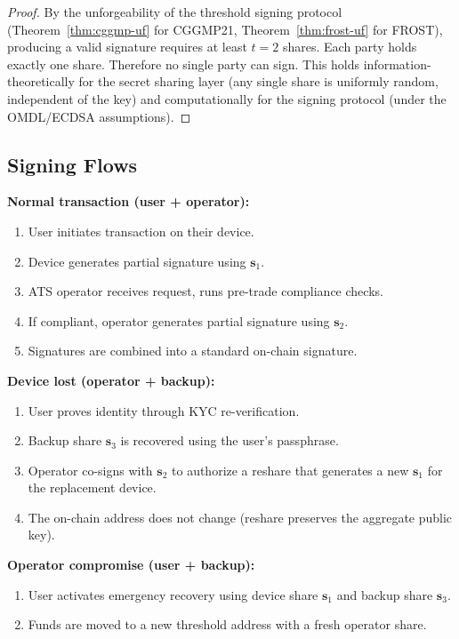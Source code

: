 \documentclass[11pt,a4paper]{article}
\begin{document}
\begin{proof}
By the unforgeability of the threshold signing protocol
(Theorem~\ref{thm:cggmp-uf} for CGGMP21,
Theorem~\ref{thm:frost-uf} for FROST), producing a valid signature
requires at least $t = 2$ shares.  Each party holds exactly one share.
Therefore no single party can sign.  This holds information-theoretically
for the secret sharing layer (any single share is uniformly random,
independent of the key) and computationally for the signing protocol
(under the OMDL/ECDSA assumptions).
\end{proof}

\subsection{Signing Flows}

\textbf{Normal transaction (user + operator):}
\begin{enumerate}[nosep]
  \item User initiates transaction on their device.
  \item Device generates partial signature using $\mathbf{s}_1$.
  \item ATS operator receives request, runs pre-trade compliance checks.
  \item If compliant, operator generates partial signature using
        $\mathbf{s}_2$.
  \item Signatures are combined into a standard on-chain signature.
\end{enumerate}

\textbf{Device lost (operator + backup):}
\begin{enumerate}[nosep]
  \item User proves identity through KYC re-verification.
  \item Backup share $\mathbf{s}_3$ is recovered using the user's
        passphrase.
  \item Operator co-signs with $\mathbf{s}_2$ to authorize a reshare
        that generates a new $\mathbf{s}_1$ for the replacement device.
  \item The on-chain address does not change (reshare preserves the
        aggregate public key).
\end{enumerate}

\textbf{Operator compromise (user + backup):}
\begin{enumerate}[nosep]
  \item User activates emergency recovery using device share
        $\mathbf{s}_1$ and backup share $\mathbf{s}_3$.
  \item Funds are moved to a new threshold address with a fresh
        operator share.
\end{enumerate}
\end{document}
